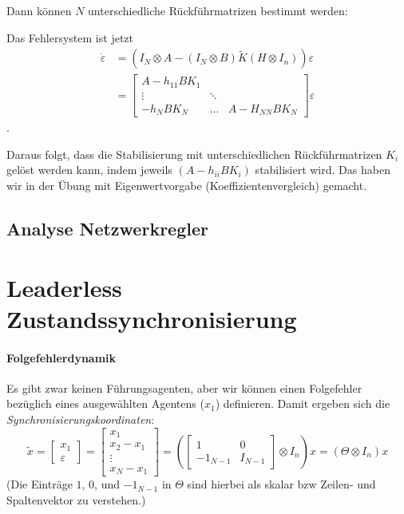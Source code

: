 Dann können $N$ unterschiedliche Rückführmatrizen bestimmt werden:

Das Fehlersystem ist jetzt
\begin{align}
    \dot{\varepsilon} &= (I_N \otimes A - (I_N \otimes B)\tilde{K}(H \otimes I_n))\varepsilon \\
    &= \begin{bmatrix}
        A-h_{11}BK_1 & & \\
        \vdots & \ddots & \\
        -h_N B K_N & \dots & A-H_{NN} BK_N
    \end{bmatrix} \varepsilon
\end{align}.

Daraus folgt, dass die Stabilisierung mit unterschiedlichen Rückführmatrizen $K_i$
gelöst werden kann, indem jeweils $(A-h_{ii}BK_i)$ stabilisiert wird.
Das haben wir in der Übung mit Eigenwertvorgabe (Koeffizientenvergleich) gemacht.

\subsection{Analyse Netzwerkregler}

\section{Leaderless Zustandssynchronisierung}
\paragraph{Folgefehlerdynamik}
Es gibt zwar keinen Führungsagenten, aber wir können einen Folgefehler
bezüglich eines ausgewählten Agentens ($x_1$) definieren.
Damit ergeben sich die \emph{Synchronisierungskoordinaten}:
\begin{equation}
    \tilde{x} = \begin{bmatrix}
        x_1 \\
        \varepsilon
    \end{bmatrix}
    = \begin{bmatrix}
        x_1 \\
        x_2 - x_1 \\
        \vdots \\
        x_N - x_1
    \end{bmatrix}
    = \left(\begin{bmatrix}
        1 & 0 \\
        -1_{N-1} & I_{N-1}
    \end{bmatrix}
    \otimes I_n
    \right) x
    = (\Theta \otimes I_n)x
\end{equation}
(Die Einträge $1$, $0$, und $-1_{N-1}$ in $\Theta$ sind hierbei als skalar bzw Zeilen- und Spaltenvektor zu verstehen.)

